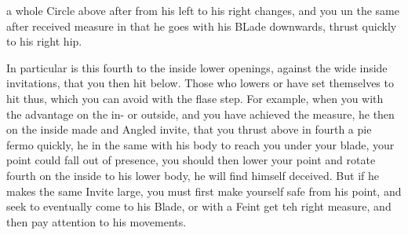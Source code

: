 \newpage


\newpage



a whole Circle above after from his left to his right changes, and you
un the same after received measure in that he goes with his BLade
downwards, thrust quickly to his right hip.


In particular is this fourth to the inside lower openings, against the
wide inside invitations, that you then hit below. Those who lowers or
have set themselves to hit thus, which you can avoid with the flase
step. For example, when you with the advantage on the in- or outside,
and you have achieved the measure, he then on the inside made and
Angled invite, that you thrust above in fourth a pie fermo quickly, he
in the same with his body to reach you under your blade, your point
could fall out of presence, you should then lower your point and
rotate fourth on the inside to his lower body, he will find himself
deceived. But if he makes the same Invite large, you must first make
yourself safe from his point, and seek to eventually come to his
Blade, or with a Feint get teh right measure, and then pay attention
to his movements.

